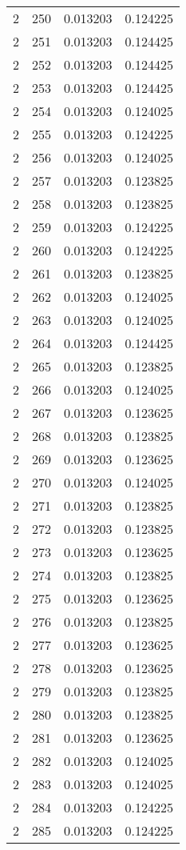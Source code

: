 \begin{longtable}{rrrr}
2 & 250 & 0.013203 & 0.124225 \\
2 & 251 & 0.013203 & 0.124425 \\
2 & 252 & 0.013203 & 0.124425 \\
2 & 253 & 0.013203 & 0.124425 \\
2 & 254 & 0.013203 & 0.124025 \\
2 & 255 & 0.013203 & 0.124225 \\
2 & 256 & 0.013203 & 0.124025 \\
2 & 257 & 0.013203 & 0.123825 \\
2 & 258 & 0.013203 & 0.123825 \\
2 & 259 & 0.013203 & 0.124225 \\
2 & 260 & 0.013203 & 0.124225 \\
2 & 261 & 0.013203 & 0.123825 \\
2 & 262 & 0.013203 & 0.124025 \\
2 & 263 & 0.013203 & 0.124025 \\
2 & 264 & 0.013203 & 0.124425 \\
2 & 265 & 0.013203 & 0.123825 \\
2 & 266 & 0.013203 & 0.124025 \\
2 & 267 & 0.013203 & 0.123625 \\
2 & 268 & 0.013203 & 0.123825 \\
2 & 269 & 0.013203 & 0.123625 \\
2 & 270 & 0.013203 & 0.124025 \\
2 & 271 & 0.013203 & 0.123825 \\
2 & 272 & 0.013203 & 0.123825 \\
2 & 273 & 0.013203 & 0.123625 \\
2 & 274 & 0.013203 & 0.123825 \\
2 & 275 & 0.013203 & 0.123625 \\
2 & 276 & 0.013203 & 0.123825 \\
2 & 277 & 0.013203 & 0.123625 \\
2 & 278 & 0.013203 & 0.123625 \\
2 & 279 & 0.013203 & 0.123825 \\
2 & 280 & 0.013203 & 0.123825 \\
2 & 281 & 0.013203 & 0.123625 \\
2 & 282 & 0.013203 & 0.124025 \\
2 & 283 & 0.013203 & 0.124025 \\
2 & 284 & 0.013203 & 0.124225 \\
2 & 285 & 0.013203 & 0.124225 \\

\end{longtable}
